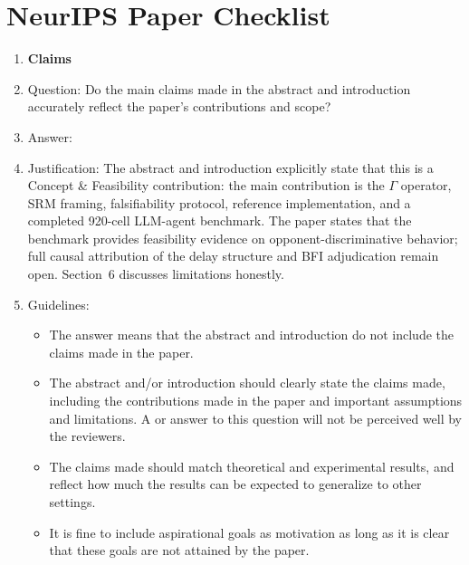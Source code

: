 \section*{NeurIPS Paper Checklist}


\begin{enumerate}

\item {\bf Claims}
    \item[] Question: Do the main claims made in the abstract and introduction accurately reflect the paper's contributions and scope?
    \item[] Answer: \answerYes{}
    \item[] Justification: The abstract and introduction explicitly state that this is a Concept \& Feasibility contribution: the main contribution is the $\Gamma$ operator, SRM framing, falsifiability protocol, reference implementation, and a completed 920-cell LLM-agent benchmark. The paper states that the benchmark provides feasibility evidence on opponent-discriminative behavior; full causal attribution of the delay structure and BFI adjudication remain open. Section~6 discusses limitations honestly.
    \item[] Guidelines:
    \begin{itemize}
        \item The answer \answerNA{} means that the abstract and introduction do not include the claims made in the paper.
        \item The abstract and/or introduction should clearly state the claims made, including the contributions made in the paper and important assumptions and limitations. A \answerNo{} or \answerNA{} answer to this question will not be perceived well by the reviewers. 
        \item The claims made should match theoretical and experimental results, and reflect how much the results can be expected to generalize to other settings. 
        \item It is fine to include aspirational goals as motivation as long as it is clear that these goals are not attained by the paper. 
    \end{itemize}


\end{enumerate}
